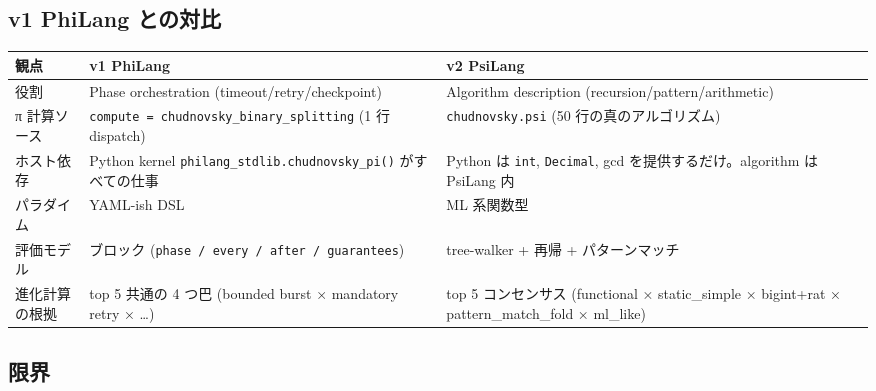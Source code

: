 \documentclass[
]{ltjsarticle}
\newcounter{none} %
\begin{document}
\subsection{v1 PhiLang
との対比}\label{v1-philang-ux3068ux306eux5bfeux6bd4}

{\def\LTcaptype{none} %
\begin{longtable}[]{@{}
  >{\raggedright\arraybackslash}p{}
  >{\raggedright\arraybackslash}p{}
  >{\raggedright\arraybackslash}p{}@{}}
\toprule\noalign{}
\begin{minipage}[b]{\linewidth}\raggedright
観点
\end{minipage} & \begin{minipage}[b]{\linewidth}\raggedright
v1 PhiLang
\end{minipage} & \begin{minipage}[b]{\linewidth}\raggedright
v2 PsiLang
\end{minipage} \\
\midrule\noalign{}
\endhead
\bottomrule\noalign{}
\endlastfoot
役割 & Phase orchestration (timeout/retry/checkpoint) & Algorithm
description (recursion/pattern/arithmetic) \\
π 計算ソース & \texttt{compute\ =\ chudnovsky\_binary\_splitting} (1 行
dispatch) & \texttt{chudnovsky.psi} (50 行の真のアルゴリズム) \\
ホスト依存 & Python kernel \texttt{philang\_stdlib.chudnovsky\_pi()}
がすべての仕事 & Python は \texttt{int}, \texttt{Decimal}, gcd
を提供するだけ。algorithm は PsiLang 内 \\
パラダイム & YAML-ish DSL & ML 系関数型 \\
評価モデル & 4 ブロック
(\texttt{phase\ /\ every\ /\ after\ /\ guarantees}) & tree-walker + 再帰
+ パターンマッチ \\
進化計算の根拠 & top 5 共通の 4 つ巴 (bounded burst × mandatory retry ×
\ldots) & top 5 コンセンサス (functional × static\_simple × bigint+rat ×
pattern\_match\_fold × ml\_like) \\
\end{longtable}
}

\subsection{限界}\label{ux9650ux754c}
\end{document}
